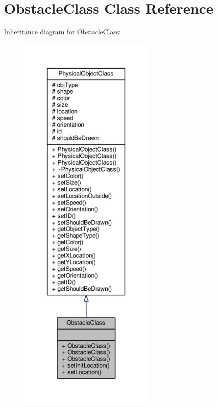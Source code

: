 \hypertarget{classObstacleClass}{\section{Obstacle\-Class Class Reference}
\label{classObstacleClass}
}


Inheritance diagram for Obstacle\-Class\-:
\nopagebreak
\begin{figure}[H]
\begin{center}
\leavevmode
\includegraphics[height=550pt]{classObstacleClass__inherit__graph}
\end{center}
\end{figure}


